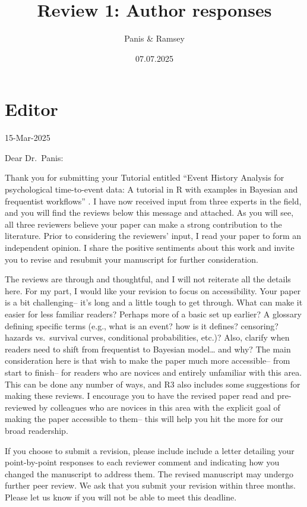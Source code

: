 \documentclass[
]{article}
\title{Review 1: Author responses}
\author{Panis \& Ramsey}
\date{07.07.2025}
\renewenvironment{quote}{\begin{leftbar}}{\end{leftbar}}
\begin{document}
\maketitle

\section{Editor}\label{editor}

\begin{quote}
15-Mar-2025

Dear Dr.~Panis:

Thank you for submitting your Tutorial entitled ``Event History Analysis
for psychological time-to-event data: A tutorial in R with examples in
Bayesian and frequentist workflows'' . I have now received input from
three experts in the field, and you will find the reviews below this
message and attached. As you will see, all three reviewers believe your
paper can make a strong contribution to the literature. Prior to
considering the reviewers' input, I read your paper to form an
independent opinion. I share the positive sentiments about this work and
invite you to revise and resubmit your manuscript for further
consideration.
\end{quote}

\begin{quote}
The reviews are through and thoughtful, and I will not reiterate all the
details here. For my part, I would like your revision to focus on
accessibility. Your paper is a bit challenging-- it's long and a little
tough to get through. What can make it easier for less familiar readers?
Perhaps more of a basic set up earlier? A glossary defining specific
terms (e.g., what is an event? how is it defines? censoring? hazards
vs.~survival curves, conditional probabilities, etc.)? Also, clarify
when readers need to shift from frequentist to Bayesian model\ldots{}
and why? The main consideration here is that wish to make the paper much
more accessible-- from start to finish-- for readers who are novices and
entirely unfamiliar with this area. This can be done any number of ways,
and R3 also includes some suggestions for making these reviews. I
encourage you to have the revised paper read and pre-reviewed by
colleagues who are novices in this area with the explicit goal of making
the paper accessible to them-- this will help you hit the more for our
broad readership.
\end{quote}

\begin{quote}
If you choose to submit a revision, please include include a letter
detailing your point-by-point responses to each reviewer comment and
indicating how you changed the manuscript to address them. The revised
manuscript may undergo further peer review. We ask that you submit your
revision within three months. Please let us know if you will not be able
to meet this deadline.
\end{quote}
\end{document}
